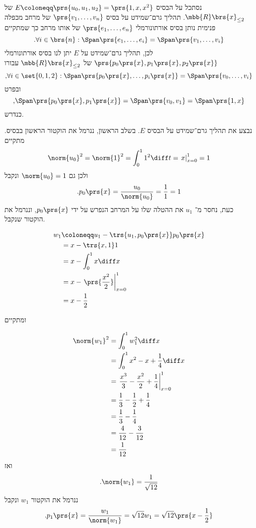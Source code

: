 \documentclass[a4paper,10pt,twoside,openany]{article}
\begin{document}
\begin{solution}
נסתכל על הבסיס
$E \coloneqq \prs{u_0, u_1, u_2} = \prs{1, x, x^2}$
של
$\mbb{R}\brs{x}_{\leq 2}$.
תהליך גרם־שמידט על בסיס
$\prs{v_1, \ldots, v_n}$
של מרחב מכפלה פנימית נותן בסיס אורתונורמלי
$\prs{e_1, \ldots, e_n}$
של אותו מרחב כך שמתקיים
\[\text{.} \forall i \in \brs{n} : \Span\prs{e_1, \ldots, e_i} = \Span\prs{v_1, \ldots, v_i}\]
לכן, תהליך גרם־שמידט על
$E$
יתן לנו בסיס אורתונורמלי
$\prs{p_0\prs{x}, p_1\prs{x}, p_2\prs{x}}$
של
$\mbb{R}\brs{x}_{\leq 2}$
עבורו
\[\text{,} \forall i \in \set{0, 1, 2} : \Span\prs{p_0\prs{x}, \ldots, p_i\prs{x}} = \Span\prs{v_0, \ldots, v_i}\]
ובפרט
\[\text{,} \Span\prs{p_0\prs{x}, p_1\prs{x}} = \Span\prs{v_0, v_1} = \Span\prs{1,x}\]
כנדרש.

נבצע את תהליך גרם־שמידט על הבסיס
$E$.
בשלב הראשון, ננרמל את הוקטור הראשון בבסיס.
מתקיים
\[\norm{u_0}^2 = \norm{1}^2 = \int_0^1 1^2 \diff t = \left. x \right|_{x=0}^1 = 1\]
ולכן גם
$\norm{u_0} = 1$
ונקבל
\[\text{.} p_0\prs{x} = \frac{u_0}{\norm{u_0}} = \frac{1}{1} = 1\]
כעת, נחסר מ־%
$u_1$
את ההטלה שלו על המרחב הנפרש על ידי
$p_0\prs{x}$,
וננרמל את הוקטור שנקבל.

\begin{align*}
w_1 &\coloneqq u_1 - \trs{u_1, p_0\prs{x}} p_0\prs{x}
\\&=
x - \trs{x, 1} 1
\\&=
x - \int_0^1 x \diff x
\\&=
x - \left.\prs{\frac{x^2}{2}} \right|_{x=0}^1
\\&=
x - \frac{1}{2}
\end{align*}

ומתקיים

\begin{align*}
\norm{w_1}^2 &=
\int_0^1 w_1^2 \diff x
\\&=
\int_0^1 x^2 - x + \frac{1}{4} \diff x
\\&=
\left. \frac{x^3}{3} - \frac{x^2}{2} + \frac{1}{4} \right|_{x = 0}^1
\\&=
\frac{1}{3} - \frac{1}{2} + \frac{1}{4}
\\&=
\frac{1}{3} - \frac{1}{4}
\\&=
\frac{4}{12} - \frac{3}{12}
\\&=
\frac{1}{12}
\end{align*}
ואז
\begin{align*}
\text{.} \norm{w_1} = \frac{1}{\sqrt{12}}
\end{align*}
ננרמל את הוקטור
$w_1$
ונקבל
\begin{align*}
\text{.} p_1\prs{x} = \frac{w_1}{\norm{w_1}} = \sqrt{12} w_1 = \sqrt{12} \prs{x - \frac{1}{2}}
\end{align*}


\end{solution}
\end{document}
